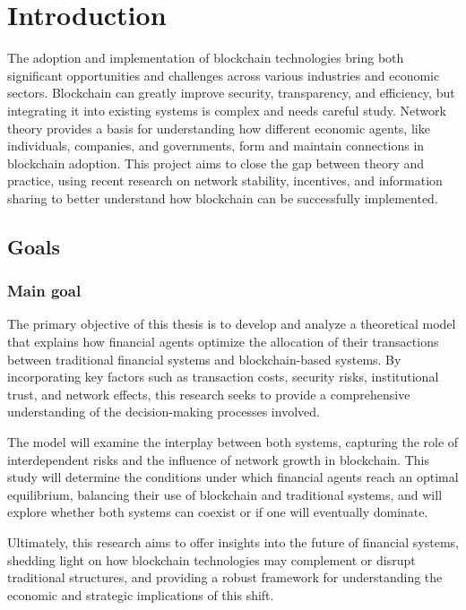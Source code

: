 
\chapter{Introduction}\label{chapter:Intro} %

The adoption and implementation of blockchain technologies bring both significant opportunities and challenges across various industries and economic sectors. Blockchain can greatly improve security, transparency, and efficiency, but integrating it into existing systems is complex and needs careful study. Network theory provides a basis for understanding how different economic agents, like individuals, companies, and governments, form and maintain connections in blockchain adoption. This project aims to close the gap between theory and practice, using recent research on network stability, incentives, and information sharing to better understand how blockchain can be successfully implemented. 


\section{Goals}
\subsection{Main goal}


The primary objective of this thesis is to develop and analyze a theoretical model that explains how financial agents optimize the allocation of their transactions between traditional financial systems and blockchain-based systems. By incorporating key factors such as transaction costs, security risks, institutional trust, and network effects, this research seeks to provide a comprehensive understanding of the decision-making processes involved.

The model will examine the interplay between both systems, capturing the role of interdependent risks and the influence of network growth in blockchain. This study will determine the conditions under which financial agents reach an optimal equilibrium, balancing their use of blockchain and traditional systems, and will explore whether both systems can coexist or if one will eventually dominate. 

Ultimately, this research aims to offer insights into the future of financial systems, shedding light on how blockchain technologies may complement or disrupt traditional structures, and providing a robust framework for understanding the economic and strategic implications of this shift.


